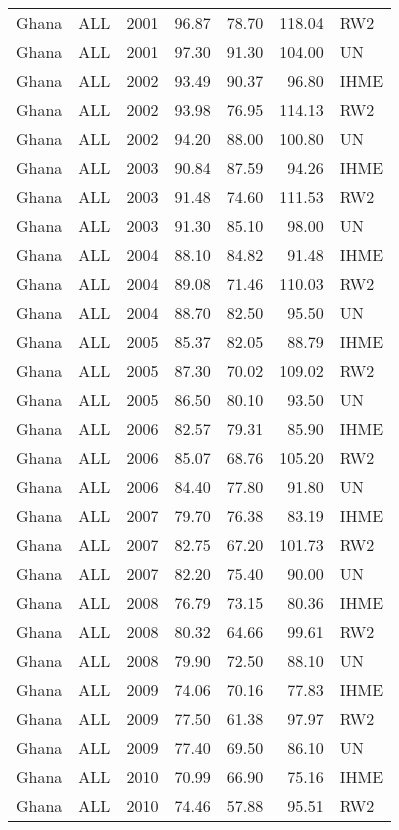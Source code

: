 \begin{longtable}{lllrrrl}
  Ghana & ALL & 2001 & 96.87 & 78.70 & 118.04 & RW2 \\ 
  Ghana & ALL & 2001 & 97.30 & 91.30 & 104.00 & UN \\ 
  Ghana & ALL & 2002 & 93.49 & 90.37 & 96.80 & IHME \\ 
  Ghana & ALL & 2002 & 93.98 & 76.95 & 114.13 & RW2 \\ 
  Ghana & ALL & 2002 & 94.20 & 88.00 & 100.80 & UN \\ 
  Ghana & ALL & 2003 & 90.84 & 87.59 & 94.26 & IHME \\ 
  Ghana & ALL & 2003 & 91.48 & 74.60 & 111.53 & RW2 \\ 
  Ghana & ALL & 2003 & 91.30 & 85.10 & 98.00 & UN \\ 
  Ghana & ALL & 2004 & 88.10 & 84.82 & 91.48 & IHME \\ 
  Ghana & ALL & 2004 & 89.08 & 71.46 & 110.03 & RW2 \\ 
  Ghana & ALL & 2004 & 88.70 & 82.50 & 95.50 & UN \\ 
  Ghana & ALL & 2005 & 85.37 & 82.05 & 88.79 & IHME \\ 
  Ghana & ALL & 2005 & 87.30 & 70.02 & 109.02 & RW2 \\ 
  Ghana & ALL & 2005 & 86.50 & 80.10 & 93.50 & UN \\ 
  Ghana & ALL & 2006 & 82.57 & 79.31 & 85.90 & IHME \\ 
  Ghana & ALL & 2006 & 85.07 & 68.76 & 105.20 & RW2 \\ 
  Ghana & ALL & 2006 & 84.40 & 77.80 & 91.80 & UN \\ 
  Ghana & ALL & 2007 & 79.70 & 76.38 & 83.19 & IHME \\ 
  Ghana & ALL & 2007 & 82.75 & 67.20 & 101.73 & RW2 \\ 
  Ghana & ALL & 2007 & 82.20 & 75.40 & 90.00 & UN \\ 
  Ghana & ALL & 2008 & 76.79 & 73.15 & 80.36 & IHME \\ 
  Ghana & ALL & 2008 & 80.32 & 64.66 & 99.61 & RW2 \\ 
  Ghana & ALL & 2008 & 79.90 & 72.50 & 88.10 & UN \\ 
  Ghana & ALL & 2009 & 74.06 & 70.16 & 77.83 & IHME \\ 
  Ghana & ALL & 2009 & 77.50 & 61.38 & 97.97 & RW2 \\ 
  Ghana & ALL & 2009 & 77.40 & 69.50 & 86.10 & UN \\ 
  Ghana & ALL & 2010 & 70.99 & 66.90 & 75.16 & IHME \\ 
  Ghana & ALL & 2010 & 74.46 & 57.88 & 95.51 & RW2 \\ 

\end{longtable}
